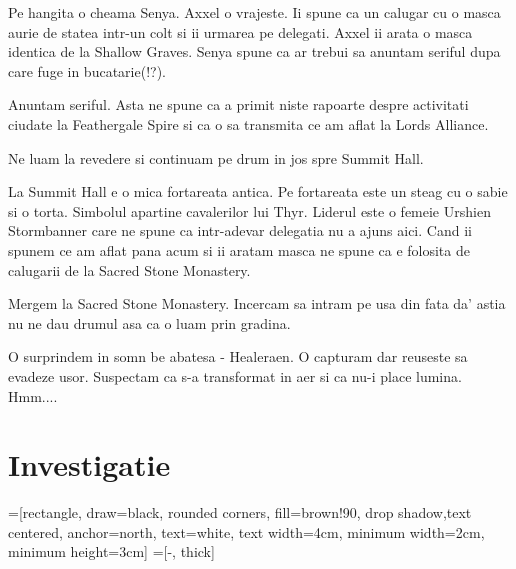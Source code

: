 \documentclass[12pt,oneside]{book}
\begin{document}
Pe hangita o cheama Senya. Axxel o vrajeste. Ii spune ca un calugar cu o masca aurie
de statea intr-un colt si ii urmarea pe delegati. Axxel ii arata o masca identica de 
la Shallow Graves. Senya spune ca ar trebui sa anuntam seriful dupa care fuge in
bucatarie(!?).

Anuntam seriful. Asta ne spune ca a primit niste rapoarte despre activitati ciudate
la Feathergale Spire si ca o sa transmita ce am aflat la Lords Alliance.

Ne luam la revedere si continuam pe drum in jos spre Summit Hall.

La Summit Hall e o mica fortareata antica. Pe fortareata este un steag cu o sabie si
o torta. Simbolul apartine cavalerilor lui Thyr. Liderul este o femeie Urshien 
Stormbanner care ne spune ca intr-adevar delegatia nu a ajuns aici. Cand ii spunem
ce am aflat pana acum si ii aratam masca ne spune ca e folosita de calugarii de la 
Sacred Stone Monastery.

Mergem la Sacred Stone Monastery. Incercam sa intram pe usa din fata da' astia
nu ne dau drumul asa ca o luam prin gradina.

O surprindem in somn be abatesa - Healeraen. O capturam dar reuseste sa evadeze usor.
Suspectam ca s-a transformat in aer si ca nu-i place lumina. 
Hmm....

\newpage

\chapter{Investigatie}
=[rectangle, draw=black, rounded corners, fill=brown!90, drop shadow,text centered, anchor=north, text=white, text width=4cm, minimum width=2cm, minimum height=3cm]
=[-, thick]
\end{document}
